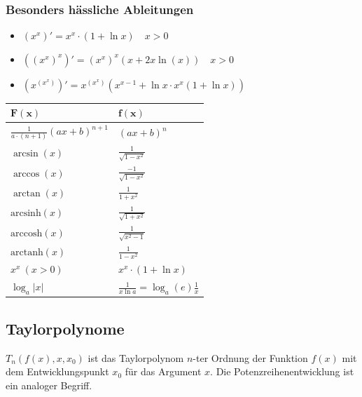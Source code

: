 \documentclass[7pt,landscape, margin = 0.1mm]{article}
\begin{document}
\begin{multicols}{4}
\begin{flushleft}
\subsubsection{Besonders hässliche Ableitungen}
\begin{itemize}
 \item $\left(x^x\right)' = x^x \cdot(1+\ln x) \quad x>0$ 
\item $\left(\left(x^x\right)^x \right)'= \left(x^x\right)^x(x+2 x \ln (x)) \quad x>0$ 
\item $\left(x^{\left(x^x\right)} \right)'=x^{\left(x^x\right)}\left(x^{x-1}+\ln x \cdot x^x(1+\ln x)\right)$
\end{itemize}
\begin{center}
  \begin{tabularx}{\linewidth}{>{\centering\arraybackslash}X>{\centering\arraybackslash}X}
  \toprule
  $\mathbf{F(x)}$ & $\mathbf{f(x)}$ \\
  \midrule
  $\frac{1}{a\cdot (n+1)}(ax+b)^{n+1}$ & $(ax+b)^n$ \\
  
  $\arcsin(x)$ & $\frac{1}{\sqrt{1 - x^2}}$ \\
  $\arccos(x)$ & $\frac{-1}{\sqrt{1 - x^2}}$ \\
  $\arctan(x)$ & $\frac{1}{1 + x^2}$ \\ 
  $\text{arcsinh}(x)$ & $\frac{1}{\sqrt{1 + x^2}}$ \\
  $\text{arccosh}(x) $ & $\frac{1}{\sqrt{x^2 - 1}}$ \\
  $\text{arctanh}(x) $ & $\frac{1}{1 - x^2}$ \\ 
  $x^x \ (x > 0)$ & $x^x \cdot (1 + \ln x)$ \\
  $\log_a|x|$ & $\frac{1}{x \ln a}=\log_a(e)\frac{1}{x}$ \\
  \bottomrule
  \end{tabularx}
\end{center}

\subsection{Taylorpolynome }
\vspace{1mm} \hline \vspace{3 mm}
$T_n(f(x), x, x_0 )$ ist das Taylorpolynom $n$-ter Ordnung der Funktion $f(x)$ mit dem Entwicklungspunkt $x_0$ für das Argument $x$. Die Potenzreihenentwicklung ist ein analoger Begriff.
\begin{itemize}





\end{itemize}
\end{flushleft}
\end{multicols}
\end{document}
